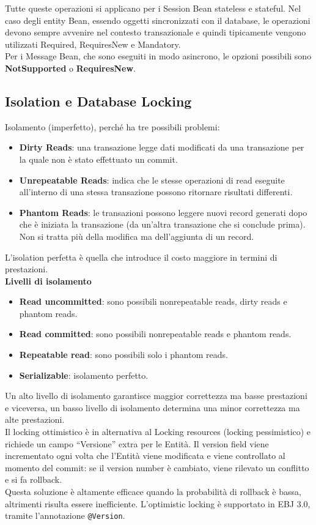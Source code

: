 Tutte queste operazioni si applicano per i Session Bean stateless e stateful. Nel caso degli entity Bean, essendo oggetti sincronizzati con il database, le operazioni devono sempre avvenire nel contesto transazionale e quindi tipicamente vengono utilizzati Required, RequiresNew e Mandatory.\\

Per i Message Bean, che sono eseguiti in modo asincrono, le opzioni possibili sono \textbf{NotSupported} o \textbf{RequiresNew}.

\subsection{Isolation e Database Locking}
Isolamento (imperfetto), perché ha tre possibili problemi:
\begin{itemize}
    \item \textbf{Dirty Reads}: una transazione legge dati modificati da una transazione per la quale non è stato effettuato un commit.
    \item \textbf{Unrepeatable Reads}: indica che le stesse operazioni di read eseguite all’interno di una stessa transazione possono ritornare risultati differenti.
    \item \textbf{Phantom Reads}: le transazioni possono leggere nuovi record generati dopo che è iniziata la transazione (da un’altra transazione che si conclude prima).\\
    Non si tratta più della modifica ma dell’aggiunta di un record.
\end{itemize}
L’isolation perfetta è quella che introduce il costo maggiore in termini di prestazioni.\\

\textbf{Livelli di isolamento}
\begin{itemize}
    \item \textbf{Read uncommitted}: sono possibili nonrepeatable reads, dirty reads e phantom reads.
    \item \textbf{Read committed}: sono possibili nonrepeatable reads e phantom reads.
    \item \textbf{Repeatable read}: sono possibili solo i phantom reads.
    \item \textbf{Serializable}: isolamento perfetto.
\end{itemize}
Un alto livello di isolamento garantisce maggior correttezza ma basse prestazioni e viceversa, un basso livello di isolamento determina una minor correttezza ma alte prestazioni.\\

Il locking ottimistico è in alternativa al Locking resources (locking pessimistico) e richiede un campo “Versione” extra per le Entità. Il version field viene incrementato ogni volta che l’Entità viene modificata e viene controllato al momento del commit: se il version number è cambiato, viene rilevato un conflitto e si fa rollback.\\

Questa soluzione è altamente efficace quando la probabilità di rollback è bassa, altrimenti risulta essere inefficiente.
L’optimistic locking è supportato in EBJ 3.0, tramite l’annotazione \texttt{@Version}.